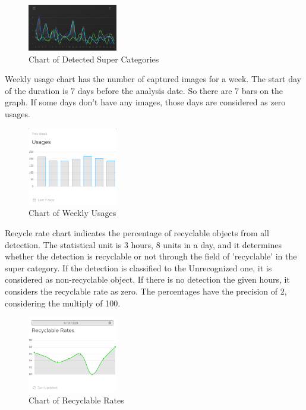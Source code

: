 \documentclass[conference]{IEEEtran}
\begin{document}
\begin{figure}[h]
    \centering
    \includegraphics[width=0.35\textwidth]{images/dashboard_day_cnt_chart.eps}
    \caption{Chart of Detected Super Categories}
\end{figure}

Weekly usage chart has the number of captured images for a week. The start day of the duration is 7 days before the analysis date. So there are 7 bars on the graph. If some days don't have any images, those days are considered as zero usages.\\

\begin{figure}[h]
    \centering
    \includegraphics[width=0.35\textwidth]{images/dashboard_week_usage_chart.eps}
    \caption{Chart of Weekly Usages}
\end{figure}

Recycle rate chart indicates the percentage of recyclable objects from all detection. The statistical unit is 3 hours, 8 units in a day, and it determines whether the detection is recyclable or not through the field of 'recyclable' in the super category. If the detection is classified to the Unrecognized one, it is considered as non-recyclable object. If there is no detection the given hours, it considers the recyclable rate as zero. The percentages have the precision of 2, considering the multiply of 100.\\

\begin{figure}[h]
    \centering
    \includegraphics[width=0.35\textwidth]{images/dashboard_rec_chart.eps}
    \caption{Chart of Recyclable Rates}
\end{figure}
\end{document}
